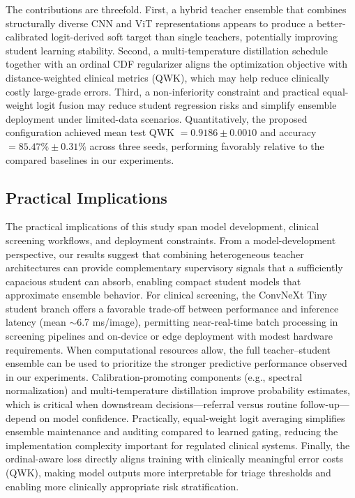 \documentclass[a4paper,fleqn]{cas-dc}
\begin{document}
The contributions are threefold. First, a hybrid teacher ensemble that combines structurally diverse CNN and ViT representations appears to produce a better-calibrated logit-derived soft target than single teachers, potentially improving student learning stability. Second, a multi-temperature distillation schedule together with an ordinal CDF regularizer aligns the optimization objective with distance-weighted clinical metrics (QWK), which may help reduce clinically costly large-grade errors. Third, a non-inferiority constraint and practical equal-weight logit fusion may reduce student regression risks and simplify ensemble deployment under limited-data scenarios. Quantitatively, the proposed configuration achieved mean test QWK $=0.9186\pm0.0010$ and accuracy $=85.47\%\pm0.31\%$ across three seeds, performing favorably relative to the compared baselines in our experiments.

\subsection{Practical Implications}
\label{sec:practical_implications}

The practical implications of this study span model development, clinical screening workflows, and deployment constraints. From a model-development perspective, our results suggest that combining heterogeneous teacher architectures can provide complementary supervisory signals that a sufficiently capacious student can absorb, enabling compact student models that approximate ensemble behavior. For clinical screening, the ConvNeXt Tiny student branch offers a favorable trade-off between performance and inference latency (mean $\sim$6.7 ms/image), permitting near-real-time batch processing in screening pipelines and on-device or edge deployment with modest hardware requirements. When computational resources allow, the full teacher--student ensemble can be used to prioritize the stronger predictive performance observed in our experiments. Calibration-promoting components (e.g., spectral normalization) and multi-temperature distillation improve probability estimates, which is critical when downstream decisions---referral versus routine follow-up---depend on model confidence. Practically, equal-weight logit averaging simplifies ensemble maintenance and auditing compared to learned gating, reducing the implementation complexity important for regulated clinical systems. Finally, the ordinal-aware loss directly aligns training with clinically meaningful error costs (QWK), making model outputs more interpretable for triage thresholds and enabling more clinically appropriate risk stratification.
\end{document}
